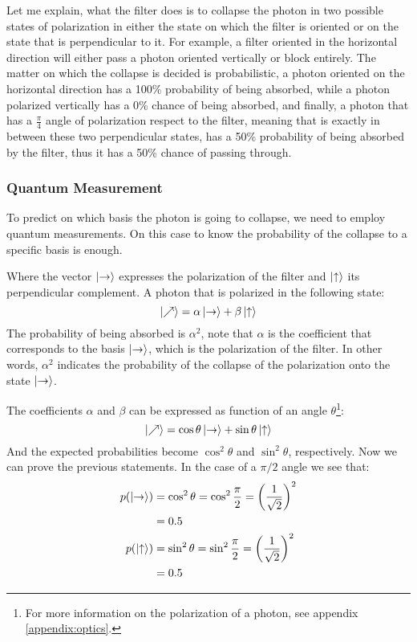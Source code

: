 Let me explain, what the filter does is to collapse the photon in two possible states of polarization in either the state on which the filter is oriented or on the state that is perpendicular to it. For example, a filter oriented in the horizontal direction will either pass a photon oriented vertically or block entirely.  The matter on which the collapse is decided is probabilistic, a photon oriented on the horizontal direction has a 100\% probability of being absorbed, while a photon polarized vertically has a 0\% chance of being absorbed, and finally, a photon that has a $\frac{\pi}{4}$ angle of polarization respect to the filter, meaning that is exactly in between these two perpendicular states, has a 50\% probability of being absorbed by the filter, thus it has a 50\% chance of passing through. 

\subsubsection{Quantum Measurement}
To predict on which basis the photon is going to collapse, we need to employ quantum measurements. On this case to know the probability of the collapse to a specific basis is enough. 

Where the vector $\ket{\text{\textrightarrow}}$ expresses the polarization of the filter and $\ket{\text{\textuparrow}}$ its perpendicular complement. A photon that is polarized in the following state:
$$
\ket{\nearrow} = \alpha\ket{\text{\textrightarrow}} + \beta\ket{\text{\textuparrow}}
$$
The probability of being absorbed is $\alpha^2$, note that $\alpha$ is the coefficient that corresponds to the basis $\ket{\text{\textrightarrow}}$, which is the polarization of the filter. In other words, $\alpha^2$ indicates the probability of the collapse of the polarization onto the state $\ket{\text{\textrightarrow}}$. 

The coefficients $\alpha$ and $\beta$ can be expressed as function of an angle $\theta$\footnote{For more information on the polarization of a photon, see appendix \ref{appendix:optics}.}:
\begin{equation}
	\ket{\nearrow} = \cos\theta\ket{\text{\textrightarrow}} + \sin\theta\ket{\text{\textuparrow}}
	\label{eq:photon_state}
\end{equation}
And the expected probabilities become $\cos^2\theta$ and  $\sin^2\theta$, respectively. Now we can prove the previous statements. In the case of a $\pi/2$ angle we see that:
\begin{align*}
	p(\ket{\text{\textrightarrow}}) &= \cos^2\theta 
	= \cos^2 \frac{\pi}{2}
	= \left( \frac{1}{\sqrt{2}} \right) ^2 \\
	&= 0.5 \\
	p(\ket{\text{\textuparrow}}) &= \sin^2\theta 
	= \sin^2 \frac{\pi}{2}
	= \left( \frac{1}{\sqrt{2}} \right) ^2 \\
	&= 0.5 \\	
\end{align*} 
